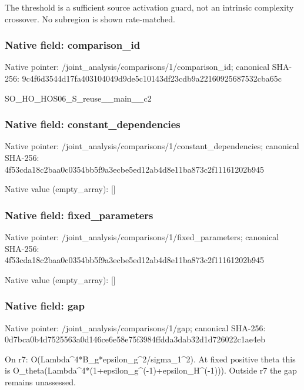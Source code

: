 \documentclass[10pt,a4paper]{article}
\begin{document}
\begingroup\raggedright\sloppy The threshold is a sufficient source activation guard,\allowbreak{} not an intrinsic complexity crossover. No subregion is shown rate-matched.\par\endgroup

\subsubsection{Native field: comparison\_\allowbreak{}id}
Native pointer: /joint\_\allowbreak{}analysis/comparisons/1/comparison\_\allowbreak{}id; canonical SHA-256: 9c4f6d3544d17fa403104049d9de5c10143df23cdb9a22160925687532cba65c

\begingroup\raggedright\sloppy SO\_\allowbreak{}HO\_\allowbreak{}HOS06\_\allowbreak{}S\_\allowbreak{}reuse\_\allowbreak{}\_\allowbreak{}main\_\allowbreak{}\_\allowbreak{}c2\par\endgroup

\subsubsection{Native field: constant\_\allowbreak{}dependencies}
Native pointer: /joint\_\allowbreak{}analysis/comparisons/1/constant\_\allowbreak{}dependencies; canonical SHA-256: 4f53cda18c2baa0c0354bb5f9a3ecbe5ed12ab4d8e11ba873c2f11161202b945

Native value (empty\_\allowbreak{}array): []

\subsubsection{Native field: fixed\_\allowbreak{}parameters}
Native pointer: /joint\_\allowbreak{}analysis/comparisons/1/fixed\_\allowbreak{}parameters; canonical SHA-256: 4f53cda18c2baa0c0354bb5f9a3ecbe5ed12ab4d8e11ba873c2f11161202b945

Native value (empty\_\allowbreak{}array): []

\subsubsection{Native field: gap}
Native pointer: /joint\_\allowbreak{}analysis/comparisons/1/gap; canonical SHA-256: 0d7bca0b4d7525563a0d146ce6e58e75f3984ffdda3dab32d1d726022c1ae4eb

\begingroup\raggedright\sloppy On r7:\allowbreak{} O(Lambda\textasciicircum{}4*B\_\allowbreak{}g*epsilon\_\allowbreak{}g\textasciicircum{}2/\allowbreak{}sigma\_\allowbreak{}1\textasciicircum{}2). At fixed positive theta this is O\_\allowbreak{}theta(Lambda\textasciicircum{}4*(1+epsilon\_\allowbreak{}g\textasciicircum{}(-1)+epsilon\_\allowbreak{}H\textasciicircum{}(-1))). Outside r7 the gap remains unassessed.\par\endgroup
\end{document}
